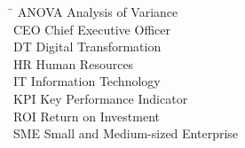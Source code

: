 
\begin{tabbing}
    \hspace{3cm}\= \kill
    ANOVA    \> Analysis of Variance \\
    CEO      \> Chief Executive Officer \\
    DT       \> Digital Transformation \\
    HR       \> Human Resources \\
    IT       \> Information Technology \\
    KPI      \> Key Performance Indicator \\
    ROI      \> Return on Investment \\
    SME      \> Small and Medium-sized Enterprise \\
\end{tabbing}
